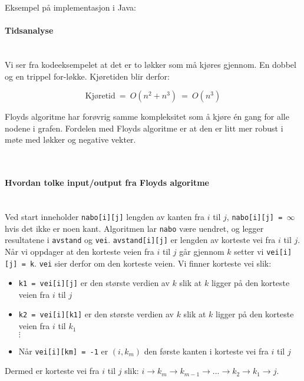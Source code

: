 \noindent Eksempel på implementasjon i Java:

\paragraph{Tidsanalyse}~\\
Vi ser fra kodeeksempelet at det er to løkker som må kjøres gjennom. En dobbel og en trippel for-løkke. Kjøretiden blir derfor:

\[ \text{Kjøretid} ~=~ O\left(n^2 + n^3\right)  ~=~ O\left(n^3\right) \]

\noindent Floyds algoritme har forøvrig samme kompleksitet som å kjøre  én gang for alle nodene i grafen. Fordelen med Floyds algoritme er at den er litt mer robust i møte med løkker og negative vekter. 

~\\
\paragraph{Hvordan tolke input/output fra Floyds algoritme}~\\
Ved start inneholder \verb|nabo[i][j]| lengden av kanten fra $ i $ til $ j $, \verb|nabo[i][j] = |$ \infty $ hvis det ikke er noen kant. Algoritmen lar \verb|nabo| være uendret, og legger resultatene i \verb|avstand| og \verb|vei|. \verb|avstand[i][j]| er lengden av korteste vei fra $ i $ til $ j $. Når vi oppdager at den korteste veien fra $ i $ til $ j $ går gjennom $ k $ setter vi \verb|vei[i][j] = k|. \verb|vei| sier derfor om den korteste veien. Vi finner korteste vei slik:
\begin{itemize}
\item \verb|k1 = vei[i][j]| er den største verdien av $ k $ slik at $ k $ ligger på den korteste veien fra $ i $ til $ j $
\item \verb|k2 = vei[i][k1]| er den største verdien av $ k $ slik at $ k $ ligger på den korteste veien fra $ i $ til $ k_1 $
\\ $ \vdots $
\item Når \verb|vei[i][km] = -1| er $ (i, k_m) $ den første kanten i korteste vei fra $ i $ til $ j $
\end{itemize}
Dermed er korteste vei fra $ i $ til $ j $ slik: $ i \rightarrow k_m \rightarrow k_{m-1} \rightarrow ... \rightarrow k_2 \rightarrow k_1 \rightarrow j $. 